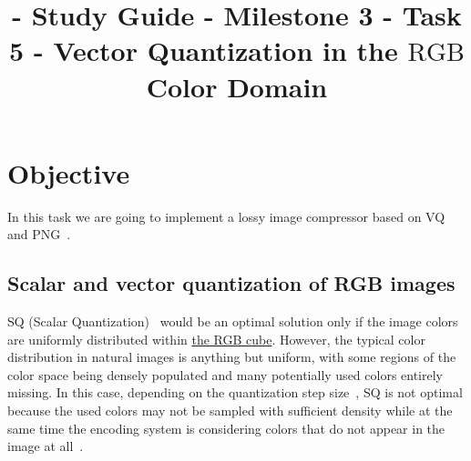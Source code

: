 

\title{\SM{} - Study Guide - Milestone 3 - Task 5 - Vector Quantization in the $\text{RGB}$ Color Domain}

\maketitle

\tableofcontents

\section{Objective}

In this task we are going to implement a lossy image compressor based
on VQ~\cite{vruiz__vector_quantization} and PNG~\cite{vruiz__PNG}.



\subsection{Scalar and vector quantization of RGB images}

SQ (Scalar Quantization)~\cite{vruiz__scalar_quantization} would be an
optimal solution only if the image colors are uniformly distributed
within \href{https://en.wikipedia.org/wiki/RGB_color_model}{the RGB
  cube}. However, the typical color distribution in natural images is
anything but uniform, with some regions of the color space being
densely populated and many potentially used colors entirely
missing. In this case, depending on the quantization step
size~\cite{vruiz__signal_quantization}, SQ is not optimal because the
used colors may not be sampled with suﬃcient density while at the same
time the encoding system is considering colors that do not appear in
the image at all~\cite{burger2016digital}.

